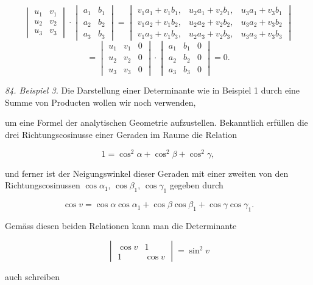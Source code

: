 \documentclass[11pt]{article}
\providecommand{\weberpage}[1]{}
\begin{document}
\[
\begin{vmatrix}u_1 & v_1\\ u_2 & v_2\\ u_3 & v_3\end{vmatrix}
\cdot
\begin{vmatrix}a_1 & b_1\\ a_2 & b_2\\ a_3 & b_3\end{vmatrix}
=
\begin{vmatrix}
v_1a_1+v_1b_1, & u_2a_1+v_2b_1, & u_3a_1+v_3b_1\\ %
v_1a_2+v_1b_2, & u_2a_2+v_2b_2, & u_3a_2+v_3b_2\\
v_1a_3+v_1b_3, & u_2a_3+v_2b_3, & u_3a_3+v_3b_3
\end{vmatrix}
\]
\[
=
\begin{vmatrix}u_1 & v_1 & 0\\ u_2 & v_2 & 0\\ u_3 & v_3 & 0\end{vmatrix}
\cdot
\begin{vmatrix}a_1 & b_1 & 0\\ a_2 & b_2 & 0\\ a_3 & b_3 & 0\end{vmatrix}
=0.
\]

\textit{84. Beispiel 3.} Die Darstellung einer Determinante wie in Beispiel 1 durch eine Summe von Producten wollen wir noch verwenden,


\weberpage{88}

um eine Formel der analytischen Geometrie aufzustellen. Bekanntlich erfüllen die drei Richtungscosinusse einer Geraden im Raume die Relation

\[
1=\cos^2\alpha+\cos^2\beta+\cos^2\gamma,
\]

und ferner ist der Neigungswinkel dieser Geraden mit einer zweiten von den Richtungscosinussen $\cos\alpha_1$, $\cos\beta_1$, $\cos\gamma_1$ gegeben durch

\[
\cos v=\cos\alpha\cos\alpha_1+\cos\beta\cos\beta_1+\cos\gamma\cos\gamma_1.
\]

Gemäss diesen beiden Relationen kann man die Determinante

\[
\begin{vmatrix}\cos v & 1\\ 1 & \cos v\end{vmatrix}=\sin^2 v
\]

auch schreiben
\end{document}
